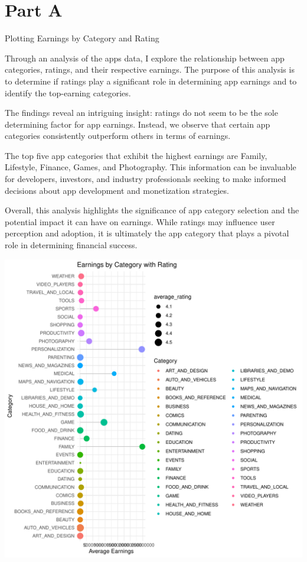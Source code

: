 \documentclass[11pt,preprint, authoryear]{elsarticle}
\numberwithin{equation}{section}
\numberwithin{figure}{section}
\numberwithin{table}{section}
\begin{document}
\hypertarget{part-a}{%
\section{Part A}\label{part-a}}

Plotting Earnings by Category and Rating

Through an analysis of the apps data, I explore the relationship between
app categories, ratings, and their respective earnings. The purpose of
this analysis is to determine if ratings play a significant role in
determining app earnings and to identify the top-earning categories.

The findings reveal an intriguing insight: ratings do not seem to be the
sole determining factor for app earnings. Instead, we observe that
certain app categories consistently outperform others in terms of
earnings.

The top five app categories that exhibit the highest earnings are
Family, Lifestyle, Finance, Games, and Photography. This information can
be invaluable for developers, investors, and industry professionals
seeking to make informed decisions about app development and
monetization strategies.

Overall, this analysis highlights the significance of app category
selection and the potential impact it can have on earnings. While
ratings may influence user perception and adoption, it is ultimately the
app category that plays a pivotal role in determining financial success.

\includegraphics[angle=90]{Question5_files/figure-latex/unnamed-chunk-1-1}
\end{document}
